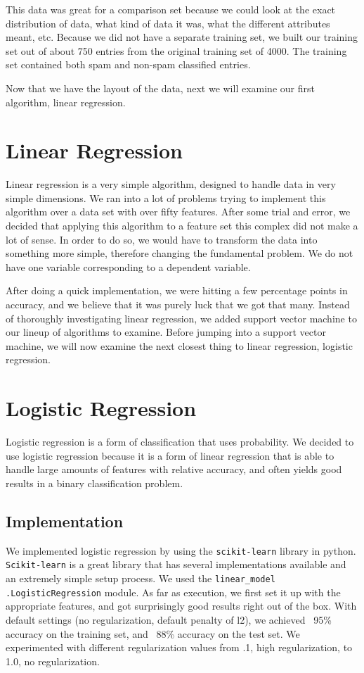 \documentclass[10pt,letterpaper,onecolumn,draftclsnofoot]{IEEEtran}
\begin{document}
This data was great for a comparison set because we could look at the exact distribution
of data, what kind of data it was, what the different attributes meant, etc. Because we
did not have a separate training set, we built our training set out of about 750 entries
from the original training set of 4000. The training set contained both spam and non-spam
classified entries.

Now that we have the layout of the data, next we will examine our first algorithm,
linear regression.

\section{Linear Regression}
Linear regression is a very simple algorithm, designed to handle data in very simple
dimensions. We ran into a lot of problems trying to implement this algorithm over
a data set with over fifty features. After some trial and error, we decided that
applying this algorithm to a feature set this complex did not make a lot of sense.
In order to do so, we would have to transform the data into something more simple, 
therefore changing the fundamental problem. We do not have one variable corresponding
to a dependent variable.

After doing a quick implementation, we were hitting a few percentage points in accuracy,
and we believe that it was purely luck that we got that many. Instead of thoroughly
investigating linear regression, we added support vector machine to our lineup of
algorithms to examine. Before jumping into a support vector machine, we will now 
examine the next closest thing to linear regression, logistic regression.

\section{Logistic Regression}
Logistic regression is a form of classification that uses probability. We decided
to use logistic regression because it is a form of linear regression that is able
to handle large amounts of features with relative accuracy, and often yields good
results in a binary classification problem. 
	\subsection{Implementation}
	We implemented logistic regression by using the \texttt{scikit-learn} library
	in python. \texttt{Scikit-learn} is a great library that has several implementations
	available and an extremely simple setup process. We used the \texttt{linear\_model}
	\texttt{.LogisticRegression} module. As far as execution, we first set it up with
	the appropriate features, and got surprisingly good results right out of the box.
	With default settings (no regularization, default penalty of l2), we achieved
	~95\% accuracy on the training set, and ~88\% accuracy on the test set. We
	experimented with different regularization values from .1, high regularization,
	to 1.0, no regularization.
	 
\end{document}
